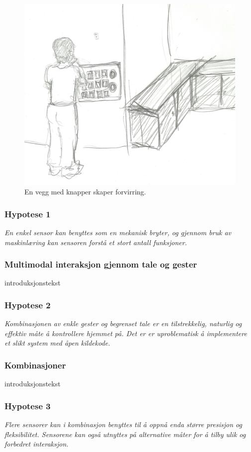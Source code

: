 \begin{figure}
\centering
\includegraphics[scale=0.1]{fig/buttons}
\caption{En vegg med knapper skaper forvirring.}
\label{fig:panel}
\end{figure}
\subsubsection*{Hypotese 1}
\emph{En enkel sensor kan benyttes som en mekanisk bryter, og gjennom bruk av maskinlæring kan sensoren forstå et stort antall funksjoner.}

\subsubsection{Multimodal interaksjon gjennom tale og gester}
introduksjonstekst
\subsubsection*{Hypotese 2}
\emph{Kombinasjonen av enkle gester og begrenset tale er en tilstrekkelig, naturlig og effektiv måte å kontrollere hjemmet på. Det er er uproblematisk å implementere et slikt system med åpen kildekode.}

\subsubsection{Kombinasjoner}
introduksjonstekst
\subsubsection*{Hypotese 3}
\emph{Flere sensorer kan i kombinasjon benyttes til å oppnå enda større presisjon og fleksibilitet. Sensorene kan også utnyttes på alternative måter for å tilby ulik og forbedret interaksjon.}

